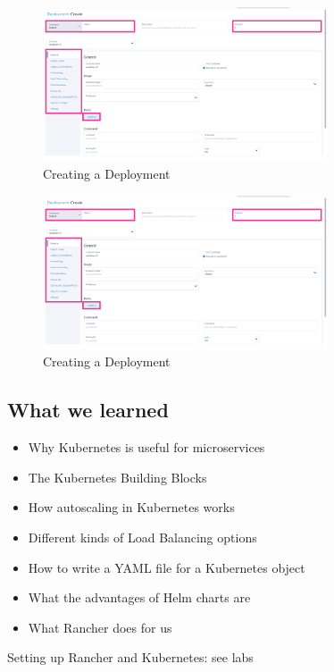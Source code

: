 \documentclass{article}
\begin{document}
\begin{figure}[H]
    \centering
    \includegraphics[width=0.75\textwidth]{img/rancher4.png}
    \caption{Creating a Deployment}
\end{figure}

\begin{figure}[H]
    \centering
    \includegraphics[width=0.75\textwidth]{img/rancher4.png}
    \caption{Creating a Deployment}
\end{figure}


\subsection{What we learned}

\begin{itemize}
    \item Why Kubernetes is useful for microservices
    \item The Kubernetes Building Blocks
    \item How autoscaling in Kubernetes works
    \item Different kinds of Load Balancing options
    \item How to write a YAML file for a Kubernetes object
    \item What the advantages of Helm charts are
    \item What Rancher does for us
\end{itemize}

Setting up Rancher and Kubernetes: see labs
\end{document}
